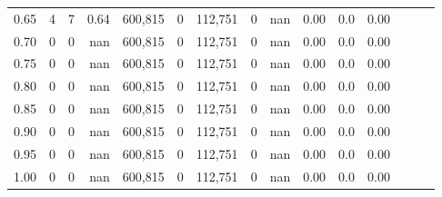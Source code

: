 \begin{tabular}{rrrrrrrrrrrrrrr}
0.65 &        4 &       7 &  0.64 &  600,815 &        0 &  112,751 &        0 &   nan &  0.00 &                     0.0 &      0.00 \\
0.70 &        0 &       0 &   nan &  600,815 &        0 &  112,751 &        0 &   nan &  0.00 &                     0.0 &      0.00 \\
0.75 &        0 &       0 &   nan &  600,815 &        0 &  112,751 &        0 &   nan &  0.00 &                     0.0 &      0.00 \\
0.80 &        0 &       0 &   nan &  600,815 &        0 &  112,751 &        0 &   nan &  0.00 &                     0.0 &      0.00 \\
0.85 &        0 &       0 &   nan &  600,815 &        0 &  112,751 &        0 &   nan &  0.00 &                     0.0 &      0.00 \\
0.90 &        0 &       0 &   nan &  600,815 &        0 &  112,751 &        0 &   nan &  0.00 &                     0.0 &      0.00 \\
0.95 &        0 &       0 &   nan &  600,815 &        0 &  112,751 &        0 &   nan &  0.00 &                     0.0 &      0.00 \\
1.00 &        0 &       0 &   nan &  600,815 &        0 &  112,751 &        0 &   nan &  0.00 &                     0.0 &      0.00 \\
\bottomrule
\end{tabular}
